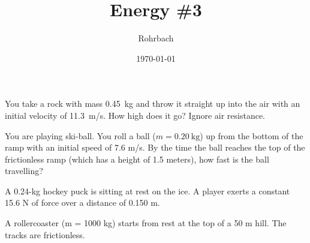 \documentclass[10pt]{exam}
\title{Energy \#3}
\author{Rohrbach}
\date{\today}
\begin{document}
\maketitle

\begin{questions}

\question
  You take a rock with mass 0.45~kg and throw it straight up into the air with an initial velocity of 11.3~m/s. How high does it go?  Ignore air resistance.
  \vs[3]

  \question
  You are playing ski-ball.  You roll a ball ($m = \SI{0.20}{\kilo\gram}$) up from the bottom of the ramp with an initial speed of 7.6 m/s.  By the time the ball reaches the top of the frictionless ramp (which has a height of 1.5 meters), how fast is the ball travelling?


  \vs[2]


\question
  A 0.24-kg hockey puck is sitting at rest on the ice.  A player exerts a constant 15.6 N of force over a distance of 0.150 m.




\pagebreak

\question
  A rollercoaster (m = 1000 kg) starts from rest at the top of a 50 m hill.  The tracks are frictionless.


\end{questions}
\end{document}
